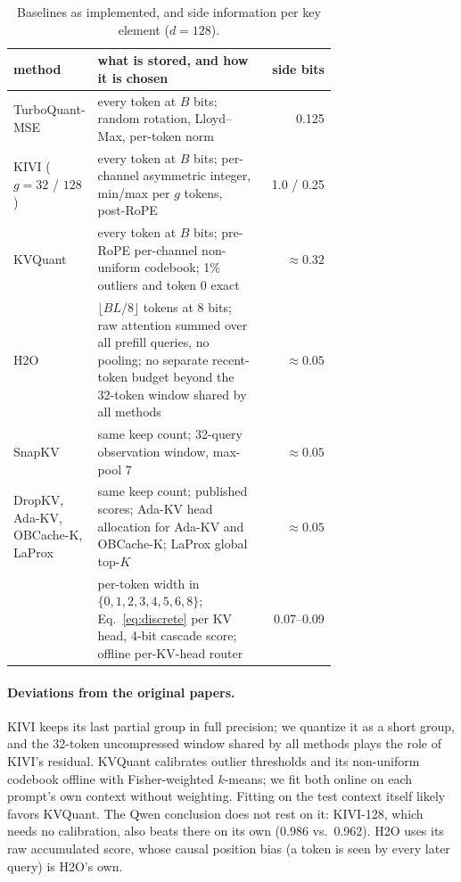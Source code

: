 \begin{table}[h]
\centering
\small
\setlength{\tabcolsep}{4pt}
\caption{Baselines as implemented, and side information per key element ($d=128$).}
\label{tab:app-side}
\begin{tabular}{@{}p{0.2\linewidth}p{0.52\linewidth}r@{}}
\toprule
method & what is stored, and how it is chosen & side bits \\
\midrule
TurboQuant-MSE & every token at $B$ bits; random rotation, Lloyd--Max, per-token norm & 0.125 \\
KIVI ($g=32$ / $128$) & every token at $B$ bits; per-channel asymmetric integer, min/max per $g$ tokens, post-RoPE & 1.0 / 0.25 \\
KVQuant & every token at $B$ bits; pre-RoPE per-channel non-uniform codebook; 1\% outliers and token 0 exact & $\approx0.32$ \\
H2O & $\lfloor BL/8\rfloor$ tokens at 8 bits; raw attention summed over all prefill queries, no pooling; no separate recent-token budget beyond the 32-token window shared by all methods & $\approx0.05$ \\
SnapKV & same keep count; 32-query observation window, max-pool 7 & $\approx0.05$ \\
DropKV, Ada-KV, OBCache-K, LaProx & same keep count; published scores; Ada-KV head allocation for Ada-KV and OBCache-K; LaProx global top-$K$ & $\approx0.05$ \\
\sieve{} & per-token width in $\{0,1,2,3,4,5,6,8\}$; Eq.~\ref{eq:discrete} per KV head, 4-bit cascade score; offline per-KV-head router & 0.07--0.09 \\
\bottomrule
\end{tabular}
\end{table}

\paragraph{Deviations from the original papers.}
KIVI keeps its last partial group in full precision; we quantize it as a short
group, and the 32-token uncompressed window shared by all methods plays the
role of KIVI's residual.  
KVQuant calibrates outlier thresholds and its
non-uniform codebook offline with Fisher-weighted $k$-means; we fit both online
on each prompt's own context without weighting.  Fitting on the test context
itself likely favors KVQuant.  The Qwen conclusion does not rest on it: KIVI-128,
which needs no calibration, also beats \sieve{} there on its own (0.986 vs.\ 0.962).  H2O
uses its raw accumulated score, whose causal position bias (a token is seen by
every later query) is H2O's own.  

